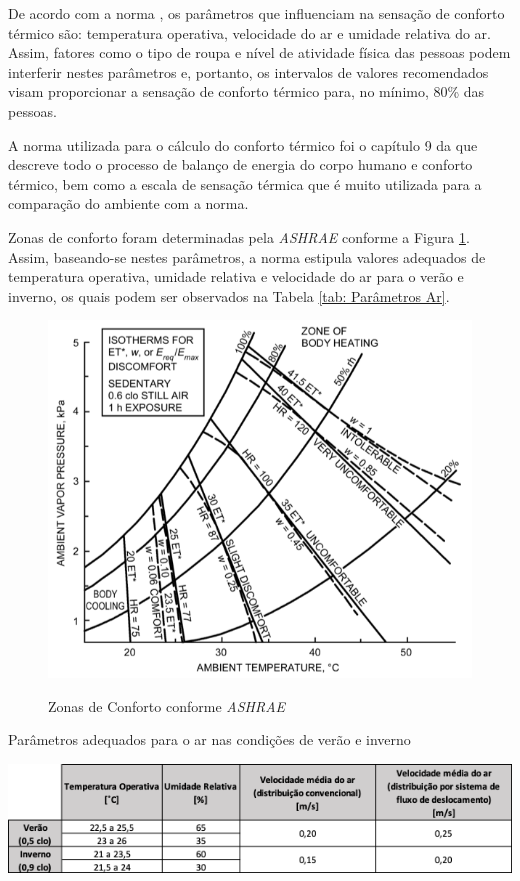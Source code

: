 \documentclass[acronym,symbols,table]{fei}
\begin{document}
De acordo com a norma \textcite{abnt216401}, os parâmetros que influenciam na sensação de conforto térmico são: temperatura operativa, velocidade do ar e umidade relativa do ar. Assim, fatores como o tipo de roupa e nível de atividade física das pessoas podem interferir nestes parâmetros e, portanto, os intervalos de valores recomendados visam proporcionar a sensação de conforto térmico para, no mínimo, 80\% das pessoas.

A norma utilizada para o cálculo do conforto térmico foi o capítulo 9 da \textcite{ASHRAE2009} que descreve todo o processo de balanço de energia do corpo humano e conforto térmico, bem como a escala de sensação térmica que é muito utilizada para a comparação do ambiente com a norma. 

Zonas de conforto foram determinadas pela \textit{ASHRAE} conforme a Figura \ref{fig: Zonas_Conforto}. Assim, baseando-se nestes parâmetros, a norma \textcite{abnt216401} estipula valores adequados de temperatura operativa, umidade relativa e velocidade do ar para o verão e inverno, os quais podem ser observados na Tabela \ref{tab: Parâmetros Ar}. 

\begin{figure}[!htb] 
 \centering
    \caption{Zonas de Conforto conforme \textit{ASHRAE}}
    \includegraphics[width=0.8\linewidth]{Imagens/Zonas_Conforto.png}
    \label{fig: Zonas_Conforto}
\end{figure}

\begin{table}[!htb] 
 \centering
    \caption{Parâmetros adequados para o ar nas condições de verão e inverno}
    \includegraphics[width=1.0\linewidth]{Tabelas/Tabela_ABNT.png}
    \label{tab: Parâmetros Ar}
\end{table}
\end{document}
